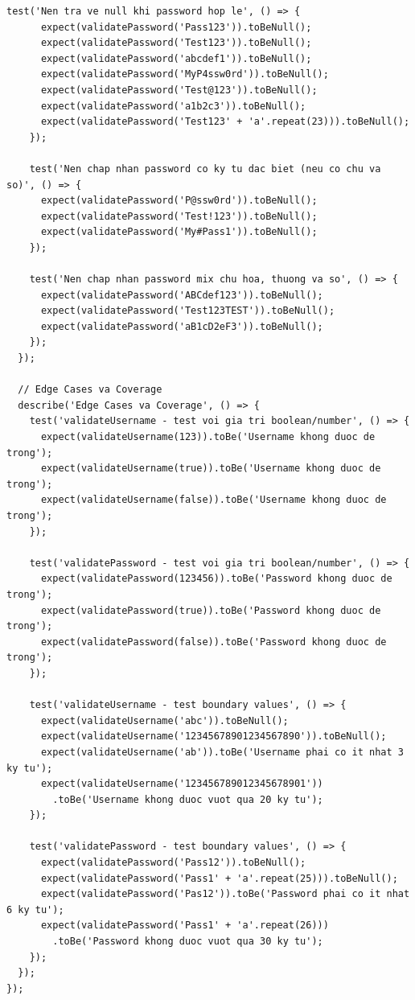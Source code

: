 \begin{lstlisting}[caption=Frontend Login Validation Tests]
    test('Nen tra ve null khi password hop le', () => {
      expect(validatePassword('Pass123')).toBeNull();
      expect(validatePassword('Test123')).toBeNull();
      expect(validatePassword('abcdef1')).toBeNull();
      expect(validatePassword('MyP4ssw0rd')).toBeNull();
      expect(validatePassword('Test@123')).toBeNull();
      expect(validatePassword('a1b2c3')).toBeNull();
      expect(validatePassword('Test123' + 'a'.repeat(23))).toBeNull();
    });
    
    test('Nen chap nhan password co ky tu dac biet (neu co chu va so)', () => {
      expect(validatePassword('P@ssw0rd')).toBeNull();
      expect(validatePassword('Test!123')).toBeNull();
      expect(validatePassword('My#Pass1')).toBeNull();
    });
    
    test('Nen chap nhan password mix chu hoa, thuong va so', () => {
      expect(validatePassword('ABCdef123')).toBeNull();
      expect(validatePassword('Test123TEST')).toBeNull();
      expect(validatePassword('aB1cD2eF3')).toBeNull();
    });
  });
  
  // Edge Cases va Coverage
  describe('Edge Cases va Coverage', () => {
    test('validateUsername - test voi gia tri boolean/number', () => {
      expect(validateUsername(123)).toBe('Username khong duoc de trong');
      expect(validateUsername(true)).toBe('Username khong duoc de trong');
      expect(validateUsername(false)).toBe('Username khong duoc de trong');
    });
    
    test('validatePassword - test voi gia tri boolean/number', () => {
      expect(validatePassword(123456)).toBe('Password khong duoc de trong');
      expect(validatePassword(true)).toBe('Password khong duoc de trong');
      expect(validatePassword(false)).toBe('Password khong duoc de trong');
    });
    
    test('validateUsername - test boundary values', () => {
      expect(validateUsername('abc')).toBeNull();
      expect(validateUsername('12345678901234567890')).toBeNull();
      expect(validateUsername('ab')).toBe('Username phai co it nhat 3 ky tu');
      expect(validateUsername('123456789012345678901'))
        .toBe('Username khong duoc vuot qua 20 ky tu');
    });
    
    test('validatePassword - test boundary values', () => {
      expect(validatePassword('Pass12')).toBeNull();
      expect(validatePassword('Pass1' + 'a'.repeat(25))).toBeNull();
      expect(validatePassword('Pas12')).toBe('Password phai co it nhat 6 ky tu');
      expect(validatePassword('Pass1' + 'a'.repeat(26)))
        .toBe('Password khong duoc vuot qua 30 ky tu');
    });
  });
});
\end{lstlisting}

